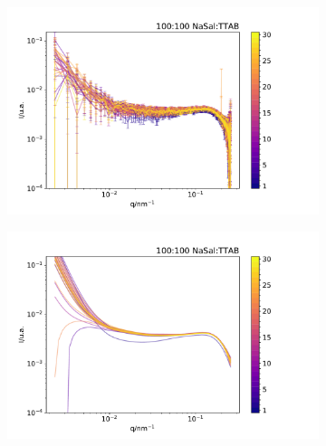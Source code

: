 
\begin{figure}[h]
    \begin{subfigure}[t]{0.5\textwidth}
        \centering
        \includegraphics[width=\textwidth]{imagens/saxs/TR_saxs_100_100_dados.pdf}
        \caption{}
        \label{fig:saxs_tr_}
    \end{subfigure}%
    \begin{subfigure}[t]{0.5\textwidth}
        \centering
        \includegraphics[width=\textwidth]{imagens/saxs/TR_saxs_100_100_ajustes.pdf}
        \caption{}
        \label{fig:saxs_tr_}
    \end{subfigure}
    \caption{}
    \label{fig:}
\end{figure} 

